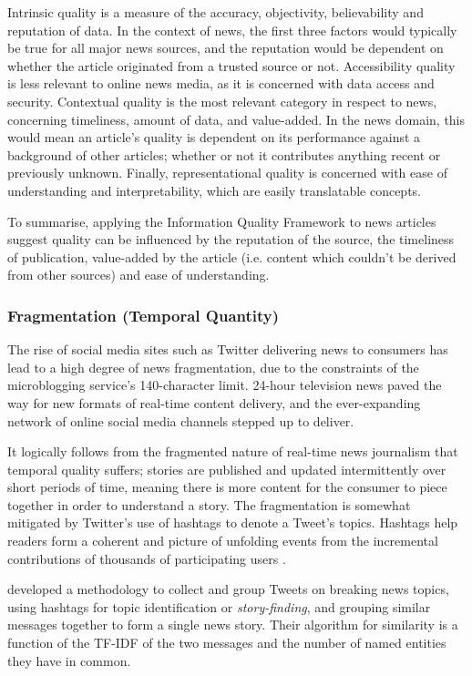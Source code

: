 Intrinsic quality is a measure of the accuracy, objectivity, believability and reputation of data. In the context of news, the first three factors would typically be true for all major news sources, and the reputation would be dependent on whether the article originated from a trusted source or not. Accessibility quality is less relevant to online news media, as it is concerned with data access and security. Contextual quality is the most relevant category in respect to news, concerning timeliness, amount of data, and value-added. In the news domain, this would mean an article's quality is dependent on its performance against a background of other articles; whether or not it contributes anything recent or previously unknown. Finally, representational quality is concerned with ease of understanding and interpretability, which are easily translatable concepts.

To summarise, applying the Information Quality Framework \citep{DataQualityInContext} to news articles suggest quality can be influenced by the reputation of the source, the timeliness of publication, value-added by the article (i.e. content which couldn't be derived from other sources) and ease of understanding.

\subsubsection{Fragmentation (Temporal Quantity)}

The rise of social media sites such as Twitter delivering news to consumers has lead to a high degree of news fragmentation, due to the constraints of the microblogging service's 140-character limit. 24-hour television news paved the way for new formats of real-time content delivery, and the ever-expanding network of online social media channels stepped up to deliver. 

It logically follows from the fragmented nature of real-time news journalism that temporal quality suffers; stories are published and updated intermittently over short periods of time, meaning there is more content for the consumer to piece together in order to understand a story. The fragmentation is somewhat mitigated by Twitter's use of hashtags to denote a Tweet's topics. Hashtags help readers form a coherent and picture of unfolding events from the incremental contributions of thousands of participating users \citep{BlogsTwitterAndBreakingNews}.

\citet{BreakingNewsDetectionAndTrackingInTwitter} developed a methodology to collect and group Tweets on breaking news topics, using hashtags for topic identification or \textit{story-finding}, and grouping similar messages together to form a single news story. Their algorithm for similarity is a function of the TF-IDF \citep{TermWeightingApproachesInAutomaticTextRetrieval} of the two messages and the number of named entities they have in common.

